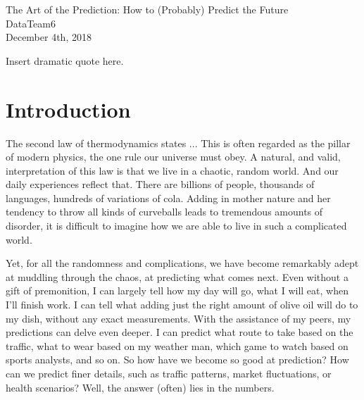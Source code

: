 \documentclass[12pt,twoside]{book}
\begin{document}
		\begin{bclogo}[couleur=MidnightBlue!2!white, arrondi=.645, logo=\bcvaletcoeur , ombre=true,epOmbre=.28,couleurOmbre=MidnightBlue!29, barre=none, nobreak=true ]{} \vspace{-2ex}	\centering\Huge The Art of the Prediction:\vspace{.5cm}  How to (Probably) Predict the Future\\[\baselineskip]	{\Large{DataTeam6}}\\ %
		{\large{ December 4th, 2018}}
	\end{bclogo}
		\vspace*{3in}
	\tableofcontents
		\begin{savequote}[45mm]
			Insert dramatic quote here.
		\end{savequote}
	\chapter{Introduction}
	The second law of thermodynamics states ...  This is often regarded as the pillar of modern physics, the one rule our universe must obey.  A natural, and valid, interpretation of this law is that we live in a chaotic, random world.  And our daily experiences reflect that.  There are billions of people, thousands of languages, hundreds of variations of cola. Adding in mother nature and her tendency to throw all kinds of curveballs leads to tremendous amounts of disorder, it is difficult to imagine how we are able to live in such a complicated world.  
	
	Yet, for all the randomness and complications, we have become remarkably adept at muddling through the chaos, at predicting what comes next.  Even without a gift of premonition, I can largely tell how my day will go, what I will eat, when I'll finish work. I can tell what adding just the right amount of olive oil will do to my dish, without any exact measurements. With the assistance of my peers, my predictions can delve even deeper. I can predict what route to take based on the traffic, what to wear based on my weather man, which game to watch based on sports analysts, and so on.  So how have we become so good at prediction?  How can we predict finer details, such as traffic patterns, market fluctuations, or health scenarios?  Well, the answer (often) lies in the numbers.
 
\end{document}
